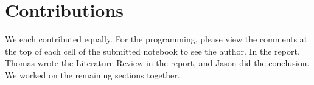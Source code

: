 \documentclass[conference]{IEEEtran}
\begin{document}
\section{Contributions}

We each contributed equally. For the programming, please view the comments at the top of each cell of the submitted notebook to see the author. In the report, Thomas wrote the Literature Review in the report, and Jason did the conclusion. We worked on the remaining sections together.



\end{document}
